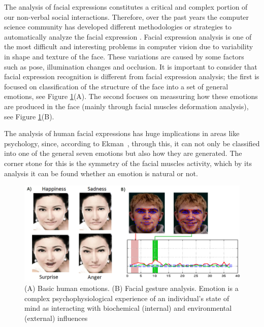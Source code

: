 The analysis of facial expressions constitutes a critical and complex portion of our non-verbal social interactions. Therefore, over the past years the computer science community has developed different methodologies or strategies to automatically analyze the facial expression \cite{Fasel1999}. Facial expression analysis is one of the most difficult and interesting problems in computer vision due to variability in shape and texture of the face. These variations are caused by some factors such as pose, illumination changes and occlusion. It is important to consider that facial expression recognition is different from facial expression analysis; the first is focused on classification of the structure of the face into a set of general emotions, see Figure \ref{fig:BasicEmotions}(A). The second focuses on meassuring how these emotions are produced in the face (mainly through facial muscles deformation analysis), see Figure \ref{fig:BasicEmotions}(B).

The analysis of human facial expressions has huge implications in areas like psychology, since, according to Ekman~\cite{Hager1979}, through this, it can not only be classified into one of the general seven emotions but also how they are generated. The corner stone for this is the symmetry of the facial muscles activity, which by its analysis it can be found whether an emotion is natural or not.

\begin{figure}[h]
    \centering
    \includegraphics[scale=0.4]{images/emotionsAndGraphics1.png}
    \caption[Basic human emotions and Facial gesture analysis]{(A) Basic human emotions. (B) Facial gesture analysis. Emotion is a complex psychophysiological experience of an individual's state of mind as interacting with biochemical (internal) and environmental (external) influences}
    \label{fig:BasicEmotions}
\end{figure}

